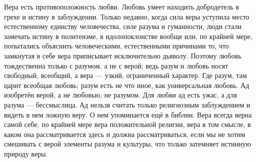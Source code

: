 \documentclass[12pt,oneside]{book}
\begin{document}
Вера есть противоположность любви. Любовь умеет находить добродетель в грехе и истину в заблуждении. Только недавно, когда сила веры уступила место естественному единству человечества, силе разума и гуманности, люди стали замечать истину в политеизме, в идолопоклонстве вообще или, по крайней мере, попытались объяснить человеческими, естественными причинами то, что замкнутая в себе вера приписывает исключительно дьяволу. Поэтому любовь тождественна только с разумом, а не с верой; ведь разум и любовь носят свободный, всеобщий, а вера --- узкий, ограниченный характер. Где разум, там царит всеобщая любовь; разум есть не что иное, как универсальная любовь. Ад изобретён верой, а не любовью, не разумом. Для любви ад есть ужас, а для разума --- бессмыслица. Ад нельзя считать только религиозным заблуждением и видеть в нем ложную веру. О нем упоминается ещё в библии. Вера всегда верна самой себе, по крайней мере вера положительной религии, вера в том смысле, в каком она рассматривается здесь и должна рассматриваться, если мы не хотим смешивать с верой элементы разума и культуры, что только затемняет истинную природу веры.
\end{document}
